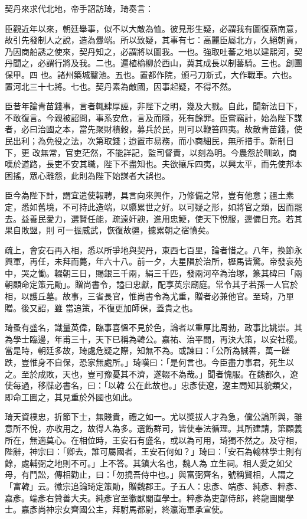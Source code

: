 \begin{pinyinscope}
 契丹來求代北地，帝手詔訪琦，琦奏言：



 臣觀近年以來，朝廷舉事，似不以大敵為恤。彼見形生疑，必謂我有圖復燕南意，故引先發制人之說，造為釁端。所以致疑，其事有七：高麗臣屬北方，久絕朝貢，乃因商舶誘之使來，契丹知之，必謂將以圖我。一也。強取吐蕃之地以建熙河，契丹聞之，必謂行將及我。二也。遍植榆柳於西山，冀其成長以制蕃騎。三也。創團保甲。四
 也。諸州築城鑿池。五也。置都作院，頒弓刀新式，大作戰車。六也。置河北三十七將。七也。契丹素為敵國，因事起疑，不得不然。



 臣昔年論青苗錢事，言者輒肆厚誣，非陛下之明，幾及大戮。自此，聞新法日下，不敢復言。今親被詔問，事系安危，言及而隱，死有餘罪。臣嘗竊計，始為陛下謀者，必曰治國之本，當先聚財積穀，募兵於民，則可以鞭笞四夷。故散青苗錢，使民出利；為免役之法，次第取錢；迨置市易務，而小商細民，無所措手。新制日下，更
 改無常，官吏茫然，不能詳記，監司督責，以刻為明。今農怨於甽畝，商嘆於道路，長吏不安其職，陛下不盡知也。夫欲攘斥四夷，以興太平，而先使邦本困搖，眾心離怨，此則為陛下始謀者大誤也。



 臣今為陛下計，謂宜遣使報聘，具言向來興作，乃修備之常，豈有他意；疆土素定，悉如舊境，不可持此造端，以隳累世之好。以可疑之形，如將官之類，因而罷去。益養民愛力，選賢任能，疏遠奸諛，進用忠鯁，使天下悅服，邊備日充。若其果自敗盟，則
 可一振威武，恢復故疆，攄累朝之宿憤矣。



 疏上，會安石再入相，悉以所爭地與契丹，東西七百里，論者惜之。八年，換節永興軍，再任，未拜而薨，年六十八。前一夕，大星隕於治所，櫪馬皆驚。帝發哀苑中，哭之慟。輟朝三日，賜銀三千兩，絹三千匹，發兩河卒為治塚，篆其碑曰「兩朝顧命定策元勛」。贈尚書令，謚曰忠獻，配享英宗廟庭。常令其子若孫一人官於相，以護丘墓。故事，三省長官，惟尚書令為尤重，贈者必兼他官。至琦，乃單贈。後又詔，雖
 當追策，不復更加師保，蓋貴之也。



 琦蚤有盛名，識量英偉，臨事喜慍不見於色，論者以重厚比周勃，政事比姚崇。其為學士臨邊，年甫三十，天下已稱為韓公。嘉祐、治平間，再決大策，以安社稷。當是時，朝廷多故，琦處危疑之際，知無不為。或諫曰：「公所為誠善，萬一蹉跌，豈惟身不自保，恐家無處所。」琦嘆曰：「是何言也。今臣盡力事君，死生以之。至於成敗，天也，豈可豫憂其不濟，遂輟不為哉。」聞者愧服。在魏都久，遼使每過，移牒必書名，曰：「以韓
 公在此故也。」忠彥使遼，遼主問知其貌類父，即命工圖之，其見重於外國也如此。



 琦天資樸忠，折節下士，無賤貴，禮之如一。尤以獎拔人才為急，儻公論所與，雖意所不悅，亦收用之，故得人為多。選飭群司，皆使奉法循理。其所建請，第顧義所在，無適莫心。在相位時，王安石有盛名，或以為可用，琦獨不然之。及守相，陛辭，神宗曰：「卿去，誰可屬國者，王安石何如？」琦曰：「安石為翰林學士則有餘，處輔弼之地則不可。」上不答。其鎮大名也，魏人為
 立生祠。相人愛之如父母，有鬥訟，傳相勸止，曰：「勿撓吾侍中也。」與富弼齊名，號稱賢相，人謂之「富韓」云。徽宗追論琦定策勛，贈魏郡王。子五人：忠彥、端彥、純彥、粹彥、嘉彥。端彥右贊善大夫。純彥官至徽猷閣直學士。粹彥為吏部侍郎，終龍圖閣學士。嘉彥尚神宗女齊國公主，拜駙馬都尉，終瀛海軍承宣使。




\end{pinyinscope}
